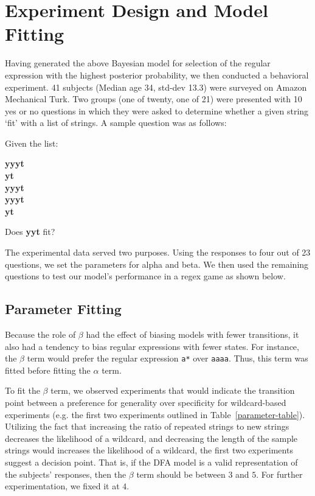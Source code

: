 \documentclass[10pt,letterpaper]{article}
\begin{document}
\section{Experiment Design and Model Fitting}
Having generated the above Bayesian model for selection of the regular expression with the highest posterior probability, we then conducted a behavioral experiment.  41 subjects (Median age 34, std-dev 13.3) were surveyed on Amazon Mechanical Turk. Two groups (one of twenty, one of 21) were presented with 10 yes or no questions in which they were asked to determine whether a given string `fit' with a list of strings. A sample question was as follows: \\
\begin{center}Given the list:

\textbf{yyyt \\
yt \\
yyyt \\
yyyt \\ 
yt}

Does \textbf{yyt} fit?
\end{center}

The experimental data served two purposes. Using the responses to four out of 23 questions, we set the parameters for alpha and beta. We then used the remaining questions to test our model's performance in a regex game as shown below. 

\subsection{Parameter Fitting}
Because the role of $\beta$ had the effect of biasing models with fewer transitions, it also had a tendency to bias regular expressions with fewer states. For instance, the $\beta$ term would prefer the regular expression \verb!a*! over \verb!aaaa!. Thus, this term was fitted before fitting the $\alpha$ term.

To fit the $\beta$ term, we observed experiments that would indicate the transition point between a preference for generality over specificity for wildcard-based experiments (e.g. the first two experiments outlined in Table~\ref{parameter-table}). Utilizing the fact that increasing the ratio of repeated strings to new strings decreases the likelihood of a wildcard, and decreasing the length of the sample strings would increases the likelihood of a wildcard, the first two experiments suggest a decision point. That is, if the DFA model is a valid representation of the subjects' responses, then the $\beta$ term should be between $3$ and $5$. For further experimentation, we fixed it at $4$.
\end{document}
